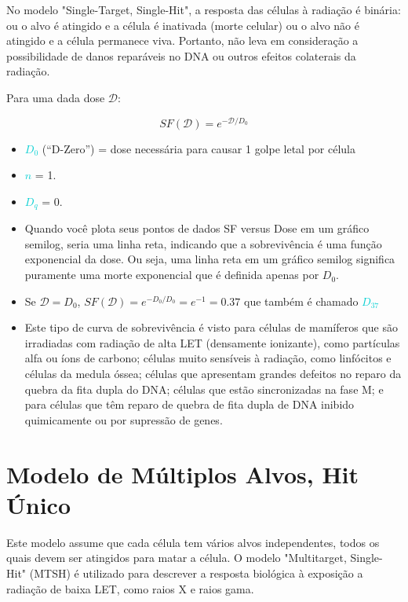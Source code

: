 \documentclass[11pt,a4paper]{article}
\newcounter{exemplo}
\begin{document}
	No modelo "Single-Target, Single-Hit", a resposta das células à radiação é binária: ou o alvo é atingido e a célula é inativada (morte celular) ou o alvo não é atingido e a célula permanece viva. Portanto, não leva em consideração a possibilidade de danos reparáveis no DNA ou outros efeitos colaterais da radiação.

	Para uma dada dose $\mathcal{D}$: 

	\begin{equation}
		SF(\mathcal{D}) = e^{-\mathcal{D}/D_0}
	\end{equation}

	\begin{exemplo}[onde:]
		\begin{itemize}
			\item \textcolor{DarkTurquoise}{\textbf{$D_0$}} (“D-Zero”) = dose necessária para causar 1 golpe letal por célula
			\item \textcolor{DarkTurquoise}{\textbf{$n$}} = 1.
			\item \textcolor{DarkTurquoise}{\textbf{$D_q$}} = 0.
			\item Quando você plota seus pontos de dados SF versus Dose em um gráfico semilog, seria uma linha reta, indicando que a sobrevivência é uma função exponencial da dose. Ou seja, uma linha reta em um gráfico semilog significa puramente uma morte exponencial que é definida apenas por $D_0$. 
			\item Se $\mathcal{D} = D_0$, $SF(\mathcal{D}) = e^{- D_0/D_0} = e^{-1} = 0.37$ que também é chamado \textcolor{DarkTurquoise}{\textbf{$D_{37}$}}
			\item Este tipo de curva de sobrevivência é visto para células de mamíferos que são irradiadas com radiação de alta LET (densamente ionizante), como partículas alfa ou íons de carbono; células muito sensíveis à radiação, como linfócitos e células da medula óssea; células que apresentam grandes defeitos no reparo da quebra da fita dupla do DNA; células que estão sincronizadas na fase M; e para células que têm reparo de quebra de fita dupla de DNA inibido quimicamente ou por supressão de genes.
		\end{itemize}
	\end{exemplo}

\section{Modelo de Múltiplos Alvos, Hit Único}

	Este modelo assume que cada célula tem vários alvos independentes, todos os quais devem ser atingidos para matar a célula.  O modelo "Multitarget, Single-Hit" (MTSH) é utilizado para descrever a resposta biológica à exposição a radiação de baixa LET, como raios X e raios gama.
\end{document}
